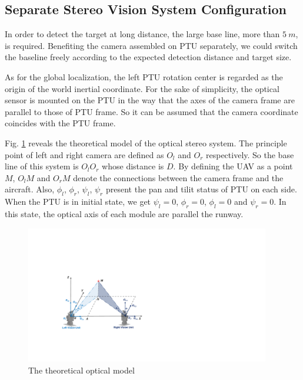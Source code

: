 \subsection{Separate Stereo Vision System Configuration}
In order to detect the target at long distance, the large base line, more than $5\ m $, is required. Benefiting the camera assembled on PTU separately, we could switch the baseline freely according to the expected detection distance and target size.

As for the global localization, the left PTU rotation center is regarded as the origin of the world inertial coordinate.  For the sake of simplicity, the optical sensor is mounted on the PTU in the way that the axes of the camera frame are parallel to those of PTU frame. So it can be assumed that the camera coordinate coincides with the PTU frame. 

Fig. \ref{fig:TheoreticalModel} reveals the theoretical model of the optical stereo system. The principle point of left and right camera are defined as ${O_l}$ and ${O_r}$ respectively. So the base line of this system is $O_lO_r$ whose distance is ${D}$. By defining the UAV as a point $M$, ${O_lM}$ and ${O_rM}$ denote the connections between the camera frame and the aircraft. Also, ${\phi_l}$, ${\phi_r}$, ${\psi_l}$, ${\psi_r}$ present the pan and tilit status of PTU on each side. When the PTU is in initial state, we get ${\psi_l=0}$, $\phi_r=0$, $\phi_l= 0$ and ${\psi_r=0}$. In this state, the optical axis of each module are parallel the runway.  
 

\begin{figure}[!tb]
	\centering
	\includegraphics[height=6cm]{figs/Fig03_Stereo.pdf}	
	\caption{The theoretical optical model}
	\label{fig:TheoreticalModel}
\end{figure}

